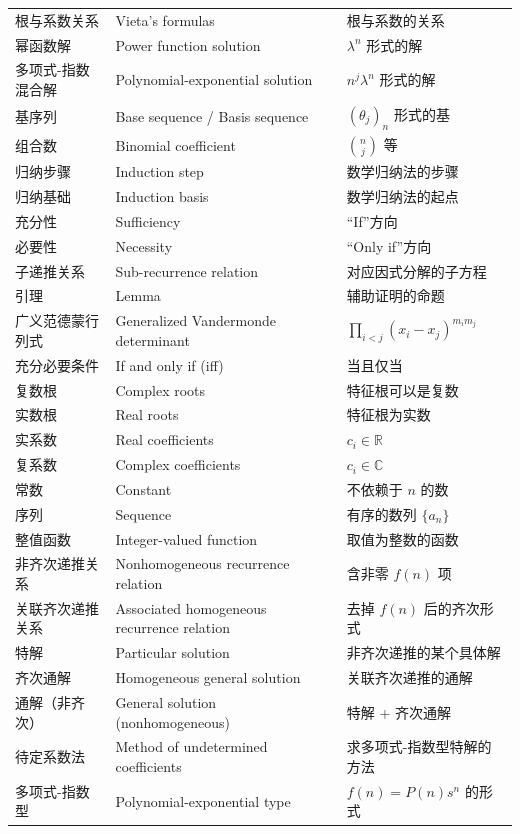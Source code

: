 \documentclass[UTF8,11pt,a4paper]{ctexbook}   %
\theoremstyle{definition}
\begin{document}
\begin{longtable}{|p{4.8cm}|p{4.8cm}|p{4.8cm}|}
根与系数关系 & Vieta's formulas & 根与系数的关系 \\
幂函数解 & Power function solution & $\lambda^n$ 形式的解 \\
多项式-指数混合解 & Polynomial-exponential solution & $n^j\lambda^n$ 形式的解 \\
基序列 & Base sequence / Basis sequence & $(\theta_j)_n$ 形式的基 \\
组合数 & Binomial coefficient & $\binom{n}{j}$ 等 \\
归纳步骤 & Induction step & 数学归纳法的步骤 \\
归纳基础 & Induction basis & 数学归纳法的起点 \\
充分性 & Sufficiency & ``If''方向 \\
必要性 & Necessity & ``Only if''方向 \\
子递推关系 & Sub-recurrence relation & 对应因式分解的子方程 \\
引理 & Lemma & 辅助证明的命题 \\
广义范德蒙行列式 & Generalized Vandermonde determinant & $\prod_{i<j}(x_i-x_j)^{m_im_j}$ \\
充分必要条件 & If and only if (iff) & 当且仅当 \\
复数根 & Complex roots & 特征根可以是复数 \\
实数根 & Real roots & 特征根为实数 \\
实系数 & Real coefficients & $c_i \in \mathbb{R}$ \\
复系数 & Complex coefficients & $c_i \in \mathbb{C}$ \\
常数 & Constant & 不依赖于 $n$ 的数 \\
序列 & Sequence & 有序的数列 $\{a_n\}$ \\
整值函数 & Integer-valued function & 取值为整数的函数 \\
\hline
非齐次递推关系 & Nonhomogeneous recurrence relation & 含非零 $f(n)$ 项 \\
关联齐次递推关系 & Associated homogeneous recurrence relation & 去掉 $f(n)$ 后的齐次形式 \\
特解 & Particular solution & 非齐次递推的某个具体解 \\
齐次通解 & Homogeneous general solution & 关联齐次递推的通解 \\
通解（非齐次） & General solution (nonhomogeneous) & 特解 + 齐次通解 \\
待定系数法 & Method of undetermined coefficients & 求多项式-指数型特解的方法 \\
多项式-指数型 & Polynomial-exponential type & $f(n)=P(n)s^n$ 的形式 \\

\end{longtable}
\end{document}
